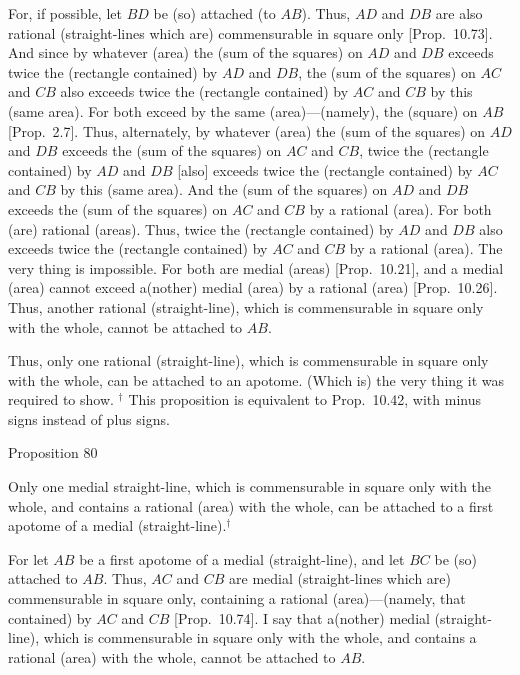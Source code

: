 For, if possible, let $BD$ be (so) attached (to $AB$). Thus, $AD$ and $DB$ are also
rational (straight-lines which are) commensurable in square only [Prop.~10.73]. And since by whatever (area)
the (sum of the squares) on $AD$ and $DB$ exceeds twice the
(rectangle contained) by $AD$ and $DB$, the (sum of the squares)
on $AC$ and $CB$ also exceeds twice the (rectangle contained) by $AC$ and
$CB$ by this (same area). For both exceed by the same (area)---(namely), the (square)
on $AB$ [Prop.~2.7]. Thus, alternately, 
by whatever (area) the (sum of the squares) on $AD$ and 
$DB$ exceeds the (sum of the squares) on $AC$ and $CB$, 
 twice the (rectangle contained) by $AD$ and $DB$
[also] exceeds twice the (rectangle contained) by $AC$ and $CB$ by this (same area).
And the (sum of the squares) on $AD$ and $DB$ exceeds the (sum
of the squares) on $AC$ and $CB$ by a rational (area). For both
(are) rational (areas). Thus, twice the (rectangle contained) by $AD$ and $DB$ also
exceeds twice the (rectangle contained) by $AC$ and $CB$ by a
rational (area). The very thing is impossible. For both are
medial (areas) [Prop.~10.21],
and a medial (area) cannot exceed a(nother) medial (area) by a rational
(area) [Prop.~10.26].  
Thus, another rational (straight-line), which is commensurable in  square only with the whole, cannot
be attached to $AB$.

Thus, only one rational (straight-line), which is
commensurable in square only with the whole, can be attached to an apotome.
(Which is) the very thing it was required to show.
{\footnotesize\noindent$^\dag$ This proposition is equivalent to 
Prop.~10.42, with minus signs instead of
plus signs.}


\begin{center}
{\large Proposition 80}
\end{center}

Only one medial straight-line,
which is commensurable in square only with the whole, and
contains a rational (area) with the whole, can be attached
to a first apotome of a medial (straight-line).$^\dag$

\epsfysize=0.26in 
\centerline{}

For let $AB$ be a first apotome of a medial (straight-line), and let $BC$ be (so) attached
to $AB$. Thus, $AC$ and $CB$ are medial (straight-lines which are)
commensurable in square only, containing a rational (area)---(namely, that
contained) by $AC$ and $CB$ [Prop.~10.74]. 
I say that a(nother) medial (straight-line), which is commensurable in square only with the whole, and
contains a rational (area) with the whole, cannot be attached to $AB$.

